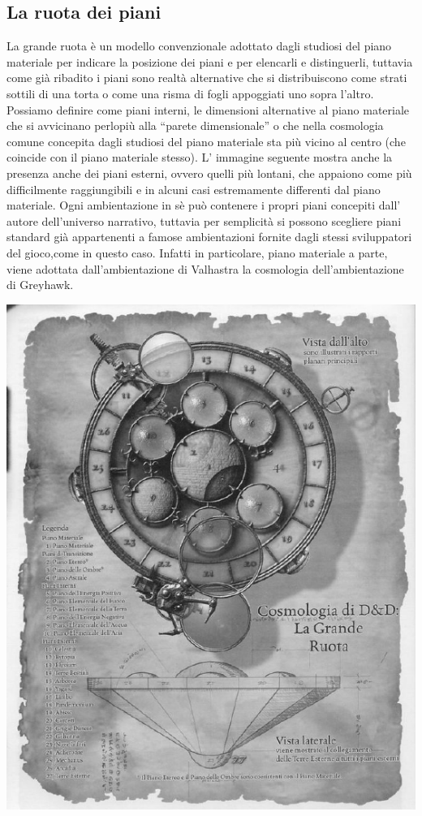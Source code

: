 \documentclass[a4paper,12pt]{book}
\begin{document}
\subsection{La ruota dei piani}

La grande ruota è un modello convenzionale adottato dagli studiosi del piano materiale per indicare la posizione dei piani e per elencarli e distinguerli, tuttavia come già ribadito i piani sono realtà alternative che si distribuiscono come strati sottili di una torta o come una risma di fogli appoggiati uno sopra l'altro.
Possiamo definire come piani interni, le dimensioni alternative al piano materiale che si avvicinano perlopiù alla ``parete dimensionale'' o che nella cosmologia comune concepita dagli studiosi del piano materiale sta più vicino al centro (che coincide con il piano materiale stesso).
L' immagine seguente mostra anche la presenza anche dei piani esterni, ovvero quelli più lontani, che appaiono come più difficilmente raggiungibili e in alcuni casi estremamente differenti dal piano materiale.
Ogni ambientazione in sè può contenere i propri piani concepiti dall' autore dell'universo narrativo, tuttavia per semplicità si possono scegliere piani standard già appartenenti a famose ambientazioni fornite dagli stessi sviluppatori del gioco,come in questo caso.
Infatti in particolare, piano materiale a parte, viene adottata dall'ambientazione di Valhastra la cosmologia dell'ambientazione di Greyhawk.

\includegraphics[scale=0.7]{Piani.png}
\newpage
\end{document}
